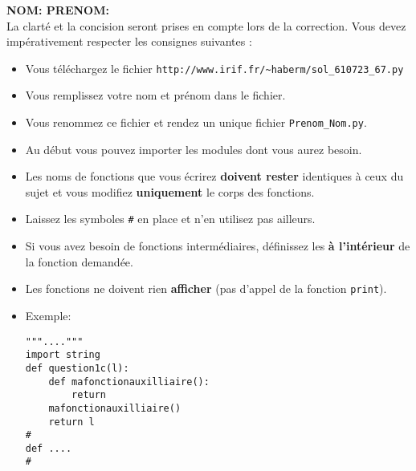 \documentclass[10pt]{article}
\begin{document}
\vspace*{-1cm}
\noindent
{\bf NOM: \hspace*{5cm} PRENOM:}\\
\noindent
La clarté et la concision seront prises en compte lors de la correction.
Vous devez impérativement respecter les consignes suivantes :
\begin{itemize}
\item Vous téléchargez le fichier \verb+http://www.irif.fr/~haberm/sol_610723_67.py+
        \item Vous remplissez votre nom et prénom dans le fichier.
	\item Vous renommez ce fichier et rendez un unique fichier
              {\tt Prenom\_Nom.py}. 
        \item Au début vous pouvez importer les modules dont vous aurez besoin.
	\item Les noms de fonctions que vous écrirez {\bf doivent rester}
	  identiques à ceux du sujet et vous modifiez {\bf uniquement}
          le corps des fonctions.
          \item Laissez les symboles \verb+#+ en place
          et n'en utilisez pas ailleurs.
        \item Si vous avez besoin de fonctions intermédiaires, définissez les
{\bf à l'intérieur} de la fonction demandée.
        \item Les fonctions ne doivent rien {\bf afficher} (pas d'appel de la fonction \verb+print+).
\item Exemple:
\begin{verbatim}
"""...."""
import string
def question1c(l):
    def mafonctionauxilliaire(): 
        return
    mafonctionauxilliaire() 
    return l
#
def ....
#
\end{verbatim}
\end{itemize}
\end{document}
